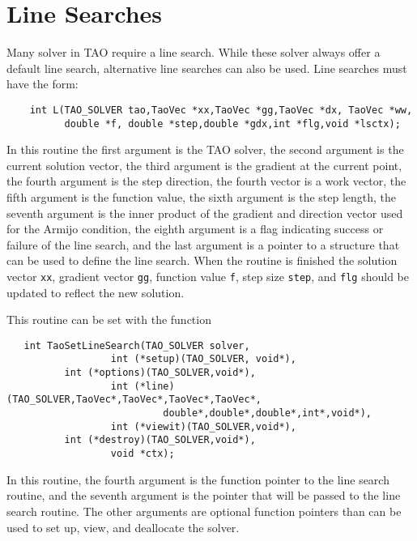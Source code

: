 \section{Line Searches} 
\label{sec:TaoLineSearch}

Many solver in TAO require a line search.  While these solver always
offer a default line search, alternative line searches can also be used.
Line searches must have the form:
\begin{verbatim}
    int L(TAO_SOLVER tao,TaoVec *xx,TaoVec *gg,TaoVec *dx, TaoVec *ww,
          double *f, double *step,double *gdx,int *flg,void *lsctx);
\end{verbatim}
In this routine the first argument is the TAO solver, the second argument
is the current solution vector, the third argument is the gradient at
the current point, the fourth argument is the step direction, the fourth
vector is a work vector, the fifth argument is the function value, the
sixth argument is the step length, the seventh argument is the inner
product of the gradient and direction vector used for the Armijo condition,
the eighth argument is a flag indicating success or
failure of the line search, and the last argument is a pointer to
a structure that can be used to define the line search.  When the 
routine is finished the solution vector {\tt xx}, gradient vector {\tt gg}, 
function value {\tt f}, step size {\tt step}, and {\tt flg} should be
updated to reflect the new solution.

This routine can be set with the function 
\begin{verbatim}
   int TaoSetLineSearch(TAO_SOLVER solver, 
                  int (*setup)(TAO_SOLVER, void*),
		  int (*options)(TAO_SOLVER,void*),
                  int (*line)(TAO_SOLVER,TaoVec*,TaoVec*,TaoVec*,TaoVec*,
                           double*,double*,double*,int*,void*),
                  int (*viewit)(TAO_SOLVER,void*),
		  int (*destroy)(TAO_SOLVER,void*),
                  void *ctx);
\end{verbatim}
\noindent
In this routine, the fourth argument is the function pointer to the line
search routine, and the seventh argument is the pointer that will be passed
to the line search routine.  The other arguments are optional function 
pointers than can be used to set up, view, and deallocate the solver.

